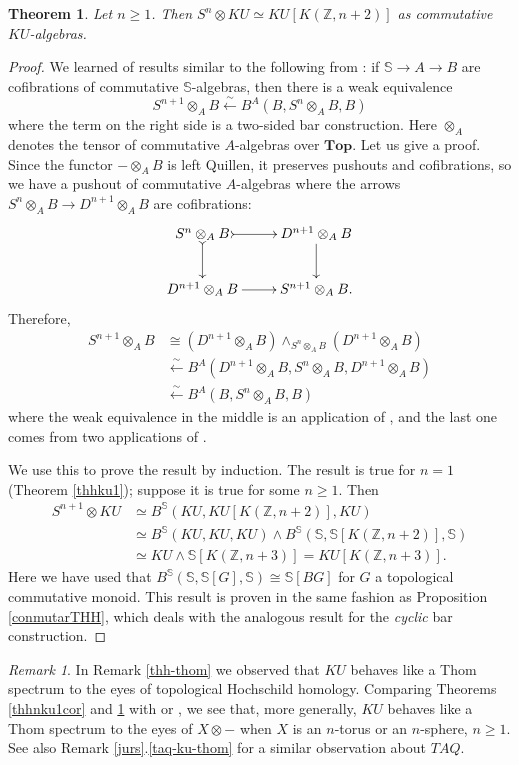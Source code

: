 \documentclass[a4paper,11pt]{amsart} %
\theoremstyle{definition} \newtheorem{defn}[equation]{Definition}
\theoremstyle{remark} \newtheorem{notation}[equation]{Notation}
\theoremstyle{plain} \newtheorem{teo}[equation]{Theorem}
\theoremstyle{plain} \newtheorem{lema}[equation]{Lemma}
\theoremstyle{plain} \newtheorem{prop}[equation]{Proposition}
\theoremstyle{plain} \newtheorem{corolario}[equation]{Corollary}
\theoremstyle{remark} \newtheorem{obs}[equation]{Remark}
\theoremstyle{remark} \newtheorem{sideobs}[equation]{Side remark}
\theoremstyle{remark} \newtheorem{ejercicio}[equation]{Exercise}
\theoremstyle{definition} \newtheorem{notn}[equation]{Notation}
\theoremstyle{remark} \newtheorem{ej}[equation]{Example}
\theoremstyle{remark} \newtheorem{contraej}[equation]{Counterexample}
\theoremstyle{plain} \newtheorem{conj}[equation]{Conjecture}
\renewcommand{\1}{\ensuremath{\mathbbm{1}}}
\renewcommand{\S}{\mathbb{S}}
\newcommand{\Z}{\mathbb{Z}}
\newcommand{\bprf}{\begin{proof}}
\newcommand{\eprf}{\end{proof}}
\newcommand{\bobs}{\begin{obs}}
\newcommand{\eobs}{\end{obs}}
\newcommand{\bteo}{\begin{teo}}
\newcommand{\eteo}{\end{teo}}
\newcommand{\Top}{\ensuremath{\mathbf{Top}}}
\numberwithin{equation}{section}
\begin{document}
\bteo \label{holo}Let $n\geq 1$. Then $S^n \otimes KU \simeq KU[K(\Z,n+2)]$ as commutative $KU$-algebras. %
\eteo
\bprf %
We learned of results similar to the following from \cite{veen}: if $\S\to A\to B$ are cofibrations of commutative $\S$-algebras, then there is a weak equivalence \[S^{n+1}\otimes_A B \stackrel{\sim}{\leftarrow} B^A(B,S^n\otimes_A B,B)\]
where the term on the right side is a two-sided bar construction. Here $\otimes_A$ denotes the tensor of commutative $A$-algebras over $\Top$. Let us give a proof. Since the functor $-\otimes_A B$ is left Quillen, it preserves pushouts and cofibrations, so we have a pushout of commutative $A$-algebras where the arrows $S^n\otimes_A B \to D^{n+1}\otimes_A B$ are cofibrations:
\[\xymatrix{S^n\otimes_A B \ar@{>->}[r] \ar@{>->}[d] & D^{n+1}\otimes_A B \ar[d] \\ D^{n+1}\otimes_A B \ar[r] & S^{n+1}\otimes_A B.}\]
Therefore, 
\begin{align*}
S^{n+1}\otimes_A B & \cong (D^{n+1}\otimes_A B) \wedge_{S^n\otimes_A B} (D^{n+1}\otimes_A B) \\ &\stackrel{\sim}{\leftarrow} B^A(D^{n+1}\otimes_A B,S^n \otimes_A B,D^{n+1}\otimes_A B)\\
&\stackrel{\sim}{\leftarrow} B^A(B, S^n\otimes_A B, B)\end{align*}
where the weak equivalence in the middle is an application of \cite[VII.7.3]{ekmm}, %
and the last one comes from two applications of \cite[VII.7.2]{ekmm}. %
%

We use this to prove the result by induction. The result is true for $n=1$ (Theorem \ref{thhku1}); suppose it is true for some $n\geq1$. Then
\begin{align*}
S^{n+1}\otimes KU &\simeq B^\S(KU,KU[K(\Z,n+2)],KU) \\
&\simeq B^\S(KU,KU,KU) \wedge B^\S(\S,\S[K(\Z,n+2)],\S) \\ %
&\simeq KU \wedge \S[K(\Z,n+3)] = KU[K(\Z,n+3)]. %
\end{align*}
Here we have used that $B^\S(\S,\S[G],\S)\cong \S[BG]$ for $G$ a topological commutative monoid. This result is proven in the same fashion as Proposition \ref{conmutarTHH}, which deals with the analogous result for the \emph{cyclic} bar construction.
\eprf

\bobs \label{x-thom} In Remark \ref{thh-thom} we observed that $KU$ behaves like a Thom spectrum to the eyes of topological Hochschild homology. Comparing Theorems \ref{thhnku1cor} and \ref{holo} with \cite[1.1]{schlichtkrull-higher} or \cite[4.11]{rsv-thom}, we see that, more generally, $KU$ behaves like a Thom spectrum to the eyes of $X\otimes -$ when $X$ is an $n$-torus or an $n$-sphere, $n\geq 1$. See also Remark \ref{jurs}.\ref{taq-ku-thom} for a similar observation about $TAQ$.\eobs
\end{document}
